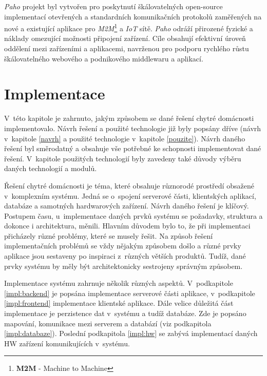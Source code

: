 \emph{Paho} projekt byl vytvořen pro poskytnutí škálovatelných open-source implementací otevřených a standardních komunikačních protokolů zaměřených na nové a
existující aplikace pro \emph{M2M}\footnote{\textbf{M2M} - Machine to Machine} a \emph{IoT} sítě.
\emph{Paho} odráží přirozené fyzické a náklady omezující možnosti připojení zařízení.
Cíle obsahují efektivní úroveň oddělení mezi zařízeními a aplikacemi, navrženou pro podporu rychlého růstu škálovatelného webového a podnikového middlewaru a aplikací.~\cite{paho:info}

\chapter{Implementace}
\label{implementace}
V~této kapitole je zahrnuto, jakým způsobem se dané řešení chytré domácnosti implementovalo.
Návrh řešení a použité technologie již byly popsány dříve (návrh v~kapitole \ref{navrh} a použité technologie v~kapitole \ref{pouzite}).
Návrh daného řešení byl směrodatný a obsahuje vše potřebné ke schopnosti implementovat dané řešení.
V~kapitole použitých technologií byly zavedeny také důvody výběru daných technologií a modulů.

Řešení chytré domácnosti je téma, které obsahuje různorodé prostředí obsažené v~komplexním systému.
Jedná se o~spojení serverové části, klientských aplikací, databáze a samotných hardwarových zařízení.
Návrh daného řešení je klíčový.
Postupem času, u~implementace daných prvků systému se požadavky, struktura a dokonce i architektura, měnili.
Hlavním důvodem bylo to, že při implementaci přicházely různé problémy, které se musely řešit.
Na způsob řešení implementačních problémů se vždy nějakým způsobem došlo a různé prvky aplikace jsou sestaveny po inspiraci z~různých větších produktů.
Tudíž, dané prvky systému by měly být architektonicky sestrojeny správným způsobem.

Implementace systému zahrnuje několik různých aspektů.
V~podkapitole \ref{impl:backend} je popsána implementace serverové části aplikace, v~podkapitole \ref{impl:frontend} implementace klientské aplikace.
Dále velice důležitá část implementace je perzistence dat v~systému a tudíž databáze. Zde je popsáno mapování, komunikace mezi serverem a databází (viz podkapitola \ref{impl:databaze}).
Poslední podkapitola \ref{impl:hw} se zabývá implementací daných HW zařízení komunikujících v~systému.


